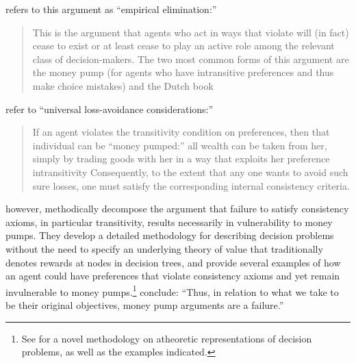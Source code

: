 \documentclass[../main.tex]{subfiles}
\begin{document}
\textcite[402-403]{Hands2014} refers to this argument as \enquote{empirical elimination:}

\singlespacing
\blockquote{
This is the argument that agents who act in ways that violate  will (in fact) cease to exist or at least cease to play an active role among the relevant class of decision-makers.
The two most common forms of this argument are the money pump (for agents who have intransitive preferences and thus make choice mistakes) and the Dutch book\textelp{}
}

\doublespacing
\noindent \textcite[336]{Grune-Yanoff2014} refer to \enquote{universal loss-avoidance considerations:}

\singlespacing
\blockquote{
If an agent violates the transitivity condition on preferences, then that individual can be \enquote{money pumped:}
all wealth can be taken from her, simply by trading goods with her in a way that exploits her preference intransitivity\textelp{}
Consequently, to the extent that any one wants to avoid such sure losses, one must satisfy the corresponding internal consistency criteria.
}
\doublespacing

\textcite{Cubitt2001} however, methodically decompose the argument that failure to satisfy consistency axioms, in particular transitivity, results necessarily in vulnerability to money pumps.
They develop a detailed methodology for describing decision problems without the need to specify an underlying theory of value that traditionally denotes rewards at nodes in decision trees, and provide several examples of how an agent could have preferences that violate consistency axioms and yet remain invulnerable to money pumps.\footnote{
	See \textcite{Cubitt2001} for a novel methodology on atheoretic representations of decision problems, as well as the examples indicated.
}
\textcite[154]{Cubitt2001} conclude: \enquote{Thus, in relation to what we take to be their original objectives, money pump arguments are a failure.}
\end{document}
